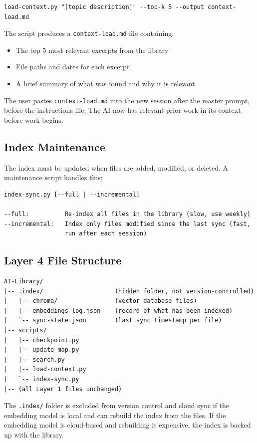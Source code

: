 \documentclass[12pt,letterpaper]{article}
\begin{document}
\begin{lstlisting}
load-context.py "[topic description]" --top-k 5 --output context-load.md
\end{lstlisting}

The script produces a \texttt{context-load.md} file containing:
\begin{itemize}
  \item The top 5 most relevant excerpts from the library
  \item File paths and dates for each excerpt
  \item A brief summary of what was found and why it is relevant
\end{itemize}

The user pastes \texttt{context-load.md} into the new session after the
master prompt, before the instructions file. The AI now has relevant
prior work in its context before work begins.

\subsection{Index Maintenance}

The index must be updated when files are added, modified, or deleted.
A maintenance script handles this:

\begin{lstlisting}
index-sync.py [--full | --incremental]

--full:          Re-index all files in the library (slow, use weekly)
--incremental:   Index only files modified since the last sync (fast,
                 run after each session)
\end{lstlisting}

\subsection{Layer 4 File Structure}

\begin{lstlisting}
AI-Library/
|-- .index/                    (hidden folder, not version-controlled)
|   |-- chroma/                (vector database files)
|   |-- embeddings-log.json    (record of what has been indexed)
|   `-- sync-state.json        (last sync timestamp per file)
|-- scripts/
|   |-- checkpoint.py
|   |-- update-map.py
|   |-- search.py
|   |-- load-context.py
|   `-- index-sync.py
|-- (all Layer 1 files unchanged)
\end{lstlisting}

The \texttt{.index/} folder is excluded from version control and cloud sync
if the embedding model is local and can rebuild the index from the files.
If the embedding model is cloud-based and rebuilding is expensive, the
index is backed up with the library.
\end{document}
